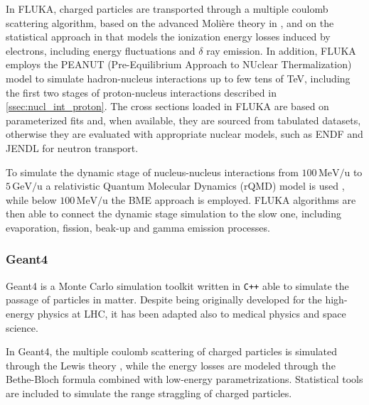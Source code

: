 In FLUKA, charged particles are transported through a multiple coulomb scattering algorithm, based on the advanced Molière theory in \cite{FERRARI1992412}, and on the statistical approach in \cite{Rinaldi_2011,articleFasso} that models the ionization energy losses induced by electrons, including energy fluctuations and $\delta$ ray emission. In addition, FLUKA employs the PEANUT (Pre-Equilibrium Approach to NUclear Thermalization) model \cite{Ferrari:682497,osti_21055002} to simulate hadron-nucleus interactions up to few tens of TeV, including the first two stages of proton-nucleus interactions described in \autoref{ssec:nucl_int_proton}. The cross sections loaded in FLUKA are based on parameterized fits and, when available, they are sourced from tabulated datasets, otherwise they are evaluated with appropriate nuclear models, such as ENDF \cite{WILLIAMS1991549} and JENDL \cite{KOSTAL2012275} for neutron transport.

To simulate the dynamic stage of nucleus-nucleus interactions from $100\,\mathrm{MeV/u}$ to $5\,\mathrm{GeV/u}$ a relativistic Quantum Molecular Dynamics (rQMD) model is used \cite{ANDERSEN20041302}, while below $100\,\mathrm{MeV/u}$ the BME \cite{Cerutti2006LOWEN} approach is employed. FLUKA algorithms are then able to connect the dynamic stage simulation to the slow one, including evaporation, fission, beak-up and gamma emission processes.
\subsubsection{Geant4}\label{sssec:geant4}
Geant4 \cite{Geant4Paper} is a Monte Carlo simulation toolkit written in \texttt{C++} able to simulate the passage of particles in matter. Despite being originally developed for the high-energy physics at LHC, it has been adapted also to medical physics and space science.

In Geant4, the multiple coulomb scattering of charged particles is simulated through the Lewis theory \cite{osti_4397140}, while the energy losses are modeled through the Bethe-Bloch formula combined with low-energy parametrizations. Statistical tools are included to simulate the range straggling of charged particles.

